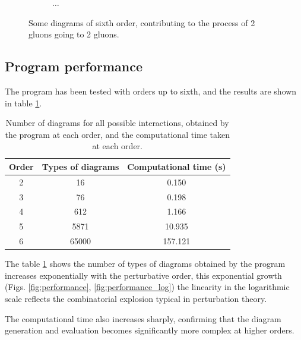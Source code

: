 \documentclass[11pt,a4paper,twoside,pdf]{article}
\numberwithin{equation}{section}
\begin{document}
\begin{figure}[h!]
\begin{subfigure}[t]{0.16\textwidth}
    \end{subfigure}
    \hfill
    \begin{subfigure}[t]{0.1\textwidth}
        \centering
        {\LARGE $\ldots$}
    \end{subfigure}
    \hfill
    \caption{Some diagrams of sixth order, contributing to the process of 
    2 gluons going to 2 gluons.}
    \label{fig:order6_2to2}
\end{figure}

\clearpage

\subsection{Program performance}

 The program has been tested with orders up to sixth, and the results are shown in table 
 \ref{tab:time_diagrams}.

\begin{table} [h!]
    \centering
    \begin{tabular}{|c|c|c|}
        \hline
        Order & Types of diagrams & Computational time (s)\\
        \hline
        2  & 16 & 0.150\\
        3  & 76 & 0.198\\
        4  & 612 & 1.166\\
        5  & 5871  & 10.935\\
        6  & 65000  & 157.121\\
        \hline
    \end{tabular}
    \caption{Number of diagrams for all possible interactions, obtained by the program 
    at each order, and the computational time taken at each order.}
    \label{tab:time_diagrams}
\end{table}

The table \ref{tab:time_diagrams} shows the number of types of diagrams obtained by
the program increases exponentially with the perturbative order, this exponential growth 
(Figs. \ref{fig:performance}, \ref{fig:performance_log}) the linearity in the logarithmic scale
reflects the combinatorial explosion typical in perturbation theory. 

The computational time also increases sharply, confirming that the diagram generation
and evaluation becomes significantly more complex at higher orders.  
\end{document}
